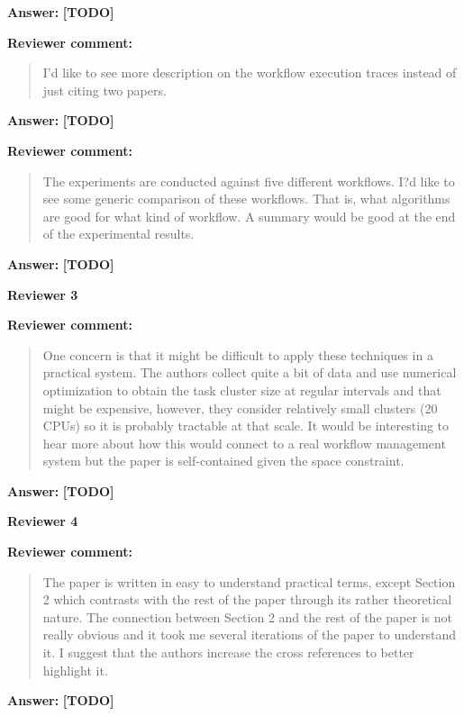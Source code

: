 \documentclass{letter}
\newenvironment{review}%
{\textbf{Reviewer comment:}\begin{quote}}%
{\end{quote}}%
\newcommand{\todo}[1]{%
      \color{red}\textbf{[TODO]} #1\color{black}}
\newcommand{\answer}[1]{%
      \textbf{Answer:} #1}
\begin{document}
\begin{letter}{}
\answer{\todo{}}



\begin{review}
I'd like to see more description on the workflow execution traces instead of just citing two papers.
\end{review}

\answer{\todo{}}



\begin{review}
The experiments are conducted against five different workflows. I?d like to see some generic comparison of these workflows. That is, what algorithms are good for what kind of workflow. A summary would be good at the end of the experimental results.
\end{review}

\answer{\todo{}}



\newpage

%
%
\textbf{Reviewer 3}

\begin{review}
One concern is that it might be difficult to apply these techniques in a practical system.  The authors collect quite a bit of data and use numerical optimization to obtain the task cluster size at regular intervals and that might be expensive, however, they consider relatively small clusters (20 CPUs) so it is probably tractable at that scale.  It would be interesting to hear more about how this would connect to a real workflow management system but the paper is self-contained given the space constraint. 
\end{review}

\answer{\todo{}}



\newpage

%
%
\textbf{Reviewer 4}

\begin{review}
The paper is written in easy to understand practical terms, except Section 2 which contrasts with the rest of the paper through its rather theoretical nature. The connection between Section 2 and the rest of the paper is not really obvious and it took me several iterations of the paper to understand it. I suggest that the authors increase the cross references to better highlight it. 
\end{review}

\answer{\todo{}}




\end{letter}
\end{document}
